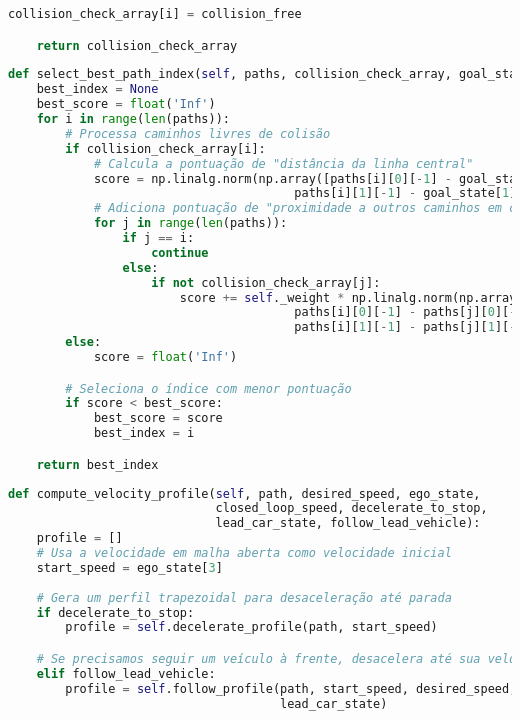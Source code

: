 \documentclass[
	12pt,				%
	oneside, %
	a4paper,			%
	english,			%
	french,				%
	spanish,			%
	brazil				%
	]{abntex2}
\begin{document}
\begin{apendicesenv}
\begin{lstlisting}[language=Python, caption=Implementação do método de verificação de colisões., label=lst:collision_check_implementation]
        collision_check_array[i] = collision_free

    return collision_check_array
\end{lstlisting}

\begin{lstlisting}[language=Python, caption=Implementação do método para seleção do melhor caminho., label=lst:select_best_path_implementation]
def select_best_path_index(self, paths, collision_check_array, goal_state):
    best_index = None
    best_score = float('Inf')
    for i in range(len(paths)):
        # Processa caminhos livres de colisão
        if collision_check_array[i]:
            # Calcula a pontuação de "distância da linha central"
            score = np.linalg.norm(np.array([paths[i][0][-1] - goal_state[0],
                                        paths[i][1][-1] - goal_state[1]]))
            # Adiciona pontuação de "proximidade a outros caminhos em colisão"
            for j in range(len(paths)):
                if j == i:
                    continue
                else:
                    if not collision_check_array[j]:
                        score += self._weight * np.linalg.norm(np.array([
                                        paths[i][0][-1] - paths[j][0][-1],
                                        paths[i][1][-1] - paths[j][1][-1]]))
        else:
            score = float('Inf')

        # Seleciona o índice com menor pontuação
        if score < best_score:
            best_score = score
            best_index = i

    return best_index
\end{lstlisting}

\begin{lstlisting}[language=Python, caption=Implementação do método principal para cálculo do perfil de velocidade., label=lst:compute_velocity_profile_implementation]
def compute_velocity_profile(self, path, desired_speed, ego_state, 
                             closed_loop_speed, decelerate_to_stop, 
                             lead_car_state, follow_lead_vehicle):
    profile = []
    # Usa a velocidade em malha aberta como velocidade inicial
    start_speed = ego_state[3]
    
    # Gera um perfil trapezoidal para desaceleração até parada
    if decelerate_to_stop:
        profile = self.decelerate_profile(path, start_speed)

    # Se precisamos seguir um veículo à frente, desacelera até sua velocidade
    elif follow_lead_vehicle:
        profile = self.follow_profile(path, start_speed, desired_speed, 
                                      lead_car_state)


\end{lstlisting}
\end{apendicesenv}
\end{document}
